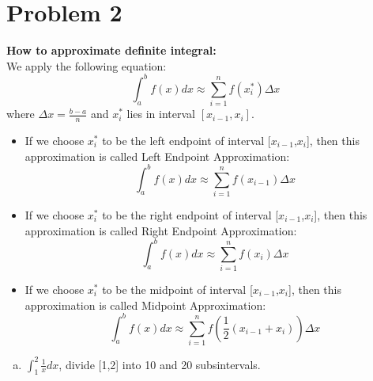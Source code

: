 \documentclass[12pt,en,a4paper]{article}
\begin{document}
	\section*{Problem 2}
	\textbf{How to approximate definite integral:}\\
	We apply the following equation: \[\int_{a}^{b}f(x)dx\approx \sum_{i=1}^{n}f(x_{i}^{*})\Delta x\] where \(\Delta x=\frac{b-a}{n}\) and \(x_{i}^{*}\) lies in interval \([x_{i-1},x_{i}]\).
	\begin{itemize}
		\item If we choose \(x_{i}^{*}\) to be the left endpoint of interval [$x_{i-1}$,$x_i$], then this approximation is called Left Endpoint Approximation:  \[\int_{a}^{b}f(x)dx\approx \sum_{i=1}^{n}f(x_{i-1})\Delta x\]
		\item If we choose \(x_{i}^{*}\) to be the right endpoint of interval [$x_{i-1}$,$x_i$], then this approximation is called Right Endpoint Approximation: \[\int_{a}^{b}f(x)dx\approx \sum_{i=1}^{n}f(x_{i})\Delta x\]
		\item If we choose \(x_{i}^{*}\) to be the midpoint of interval [$x_{i-1}$,$x_i$], then this approximation is called Midpoint Approximation: \[\int_{a}^{b}f(x)dx\approx \sum_{i=1}^{n}f(\frac{1}{2}(x_{i-1}+x_{i}))\Delta x\]
	\end{itemize}
	\begin{enumerate}[a)]
		\item \(\int_{1}^{2}\frac{1}{x}dx\), divide [1,2] into 10 and 20 subsintervals.
	\end{enumerate}
\end{document}
